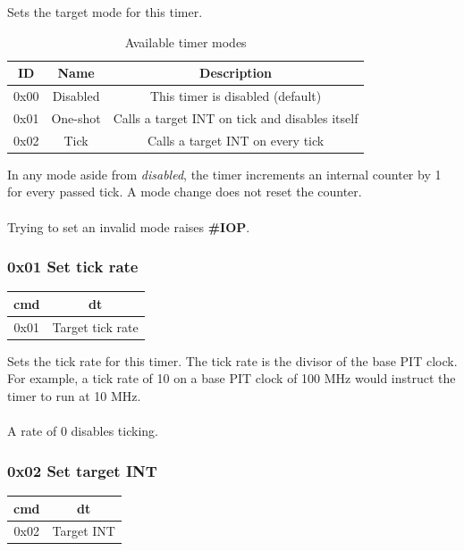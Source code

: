 \documentclass[a4paper,10pt]{article}
\begin{document}
Sets the target mode for this timer.

\begin{table}[H]
	\centering
	\caption{Available timer modes}
	{
		\begin{tabular}{|c|c|c|}
\hline
ID & Name & Description \\
\hline
0x00 & Disabled & This timer is disabled (default) \\
\hline
0x01 & One-shot & Calls a target INT on tick and disables itself \\
\hline
0x02 & Tick & Calls a target INT on every tick \\
\hline
		\end{tabular}
	}
\end{table}

In any mode aside from \emph{disabled}, the timer increments an internal counter by 1 for every passed tick. A mode change does not reset the counter.\\
\\
Trying to set an invalid mode raises \textbf{\#IOP}.

\subsubsection{0x01 Set tick rate}
\begin{table}[H]
	\centering
	{
		\begin{tabular}{|c|c|}
\hline
cmd & dt \\
\hline
0x01 & Target tick rate \\
\hline
		\end{tabular}
	}
\end{table}

Sets the tick rate for this timer. The tick rate is the divisor of the base PIT clock. For example, a tick rate of 10 on a base PIT clock of 100 MHz would instruct the timer to run at 10 MHz.\\
\\
A rate of 0 disables ticking.

\subsubsection{0x02 Set target INT}
\begin{table}[H]
	\centering
	{
		\begin{tabular}{|c|c|}
\hline
cmd & dt \\
\hline
0x02 & Target INT \\
\hline
		\end{tabular}
	}
\end{table}
\end{document}
